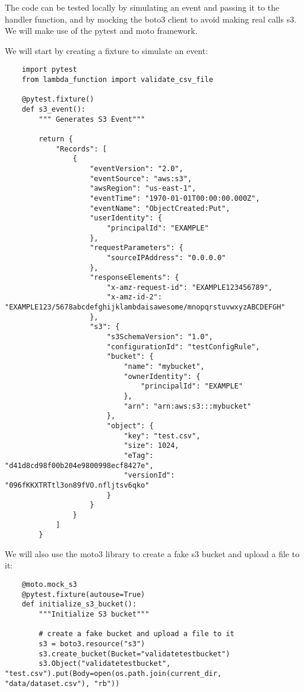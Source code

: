 \documentclass{article}
\begin{document}
The code can be tested locally by simulating an event and passing it to the handler function, and by mocking the boto3 client to avoid making real calls s3. We will make use of the pytest and moto framework.

We will start by creating a fixture to simulate an event:

\begin{verbatim}
    import pytest
    from lambda_function import validate_csv_file

    @pytest.fixture()
    def s3_event():
        """ Generates S3 Event"""

        return {
            "Records": [
                {
                    "eventVersion": "2.0",
                    "eventSource": "aws:s3",
                    "awsRegion": "us-east-1",
                    "eventTime": "1970-01-01T00:00:00.000Z",
                    "eventName": "ObjectCreated:Put",
                    "userIdentity": {
                        "principalId": "EXAMPLE"
                    },
                    "requestParameters": {
                        "sourceIPAddress": "0.0.0.0"
                    },
                    "responseElements": {
                        "x-amz-request-id": "EXAMPLE123456789",
                        "x-amz-id-2": "EXAMPLE123/5678abcdefghijklambdaisawesome/mnopqrstuvwxyzABCDEFGH"
                    },
                    "s3": {
                        "s3SchemaVersion": "1.0",
                        "configurationId": "testConfigRule",
                        "bucket": {
                            "name": "mybucket",
                            "ownerIdentity": {
                                "principalId": "EXAMPLE"
                            },
                            "arn": "arn:aws:s3:::mybucket"
                        },
                        "object": {
                            "key": "test.csv",
                            "size": 1024,
                            "eTag": "d41d8cd98f00b204e9800998ecf8427e",
                            "versionId": "096fKKXTRTtl3on89fVO.nfljtsv6qko"
                        }
                    }
                }
            ]
        }
\end{verbatim}

We will also use the moto3 library to create a fake s3 bucket and upload a file to it:

\begin{verbatim}
    @moto.mock_s3
    @pytest.fixture(autouse=True)
    def initialize_s3_bucket():
        """Initialize S3 bucket"""

        # create a fake bucket and upload a file to it
        s3 = boto3.resource("s3")
        s3.create_bucket(Bucket="validatetestbucket")
        s3.Object("validatetestbucket", "test.csv").put(Body=open(os.path.join(current_dir, "data/dataset.csv"), "rb"))
\end{verbatim}
\end{document}
